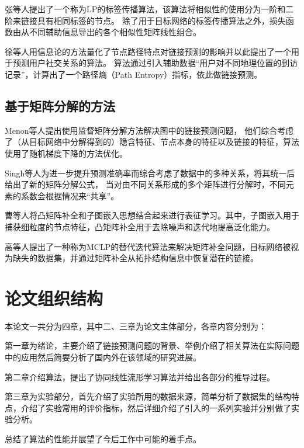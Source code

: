 张等人提出了一个称为LP的标签传播算法，该算法将相似性的使用分为一阶和二阶来链接具有相同标签的节点。
除了用于目标网络的标签传播算法之外，损失函数由从不同辅助信息导出的各个相似性矩阵线性组合。


徐等人用信息论的方法量化了节点路径特点对链接预测的影响并以此提出了一个用于预测用户社交关系的算法。
算法通过引入辅助数据“用户对不同地理位置的到访记录”，计算出了一个路径熵（Path Entropy）指标，依此做链接预测\cite{xu2016link}。

\subsection{基于矩阵分解的方法}
Menon等人提出使用监督矩阵分解方法解决图中的链接预测问题，
他们综合考虑了（从目标网络中分解得到的）隐含特征、节点本身的特征以及链接的特征，算法使用了随机梯度下降的方法优化\cite{singh2008relational}。


Singh等人为进一步提升预测准确率而综合考虑了数据中的多种关系，将其统一后给出了新的矩阵分解公式，
当对由不同关系形成的多个矩阵进行分解时，不同元素的系数会根据情况来“共享”。


曹等人将凸矩阵补全和子图嵌入思想结合起来进行表征学习。其中，子图嵌入用于捕获细粒度的节点特征，凸矩阵补全用于去除噪声和迭代地提高泛化能力。


高等人提出了一种称为MCLP的替代迭代算法来解决矩阵补全问题，目标网络被视为缺失的数据集，并通过矩阵补全从拓扑结构信息中恢复潜在的链接\cite{guimera2009missing}。

\section{论文组织结构}
本论文一共分为四章，其中二、三章为论文主体部分，各章内容分别为：


第一章为绪论，主要介绍了链接预测问题的背景、举例介绍了相关算法在实际问题中的应用然后简要分析了国内外在该领域的研究进展。


第二章介绍算法，提出了协同线性流形学习算法并给出各部分的推导过程。


第三章为实验部分，首先介绍了实验所用的数据来源，简单分析了数据集的结构特点，介绍了实验常用的评价指标，然后详细介绍了引入的一系列实验并分别做了实验分析。


总结了算法的性能并展望了今后工作中可能的着手点。